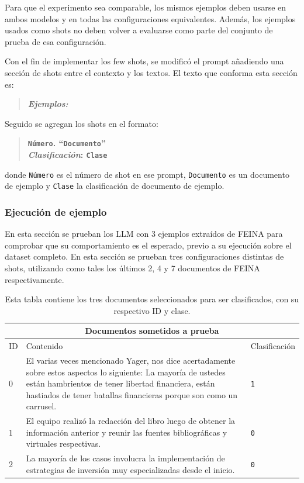 \documentclass[12pt]{article}
\newcommand{\claseSimple}{\texttt{0}}
\newcommand{\claseCompleja}{\texttt{1}}
\begin{document}
Para que el experimento sea comparable, los mismos ejemplos deben usarse en ambos modelos y en todas las configuraciones equivalentes. Además, los ejemplos usados como shots no deben volver a evaluarse como parte del conjunto de prueba de esa configuración.

Con el fin de implementar los few shots, se modificó el prompt añadiendo una sección de shots entre el contexto y los textos. El texto que conforma esta sección es:

\begin{quotation}
\textbf{\textit{Ejemplos:}}
\end{quotation}

Seguido se agregan los shots en el formato:

\begin{quotation}
\textbf{\texttt{Número}. ``\texttt{Documento}''} \\
\textbf{\textit{Clasificación}: \texttt{Clase}}
\end{quotation}

donde \texttt{Número} es el número de shot en ese prompt, \texttt{Documento} es un documento de ejemplo y \texttt{Clase} la clasificación de documento de ejemplo.

\subsubsection{Ejecución de ejemplo}
En esta sección se prueban los LLM con 3 ejemplos extraídos de FEINA para comprobar que su comportamiento es el esperado, previo a su ejecución sobre el dataset completo. En esta sección se prueban tres configuraciones distintas de shots, utilizando como tales los últimos 2, 4 y 7 documentos de FEINA respectivamente.

\begin{table}[H]
\centering
\begin{tabular}{p{}p{}p{}}
\multicolumn{3}{c}{Documentos sometidos a prueba} \\
\toprule
ID & Contenido & Clasificación \\
\midrule
0 & El varias veces mencionado Yager, nos dice acertadamente sobre estos aspectos lo siguiente: La mayoría de ustedes están hambrientos de tener libertad financiera, están hastiados de tener batallas financieras porque son como un carrusel. & \claseCompleja \\
1 & El equipo realizó la redacción del libro luego de obtener la información anterior y reunir las fuentes bibliográficas y virtuales respectivas. & \claseSimple \\
2 & La mayoría de los casos involucra la implementación de estrategias de inversión muy especializadas desde el inicio. & \claseSimple \\
\bottomrule
\end{tabular}
\caption{Esta tabla contiene los tres documentos seleccionados para ser clasificados, con su respectivo ID y clase.}
\end{table}
\end{document}
